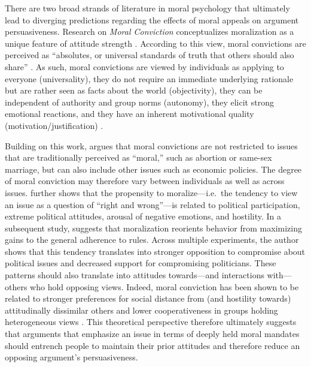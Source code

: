 There are two broad strands of literature in moral psychology that ultimately lead to diverging predictions regarding the effects of moral appeals on argument persuasiveness. Research on \textit{Moral Conviction} conceptualizes moralization as a unique feature of attitude strength \citep{skitka2005moral}. According to this view, moral convictions are perceived as ``absolutes, or universal standards of truth that others should also share'' \citep[269]{skitka2010psychology}. As such, moral convictions are viewed by individuals as applying to everyone (universality), they do not require an immediate underlying rationale but are rather seen as facts about the world (objectivity), they can be independent of authority and group norms (autonomy), they elicit strong emotional reactions, and they have an inherent motivational quality (motivation/justification) \citep{skitka2010psychology}.

Building on this work, \citet{ryan2014reconsidering} argues that moral convictions are not restricted to issues that are traditionally perceived as ``moral,'' such as abortion or same-sex marriage, but can also include other issues such as economic policies. The degree of moral conviction may therefore vary between individuals as well as across issues. \citet{ryan2014reconsidering} further shows that the propensity to moralize---i.e.~the tendency to view an issue as a question of ``right and wrong''---is related to political participation, extreme political attitudes, arousal of negative emotions, and hostility. In a subsequent study, \citet{ryan2017no} suggests that moralization reorients behavior from maximizing gains to the general adherence to rules. Across multiple experiments, the author shows that this tendency translates into stronger opposition to compromise about political issues and decreased support for compromising politicians. These patterns should also translate into attitudes towards---and interactions with---others who hold opposing views. Indeed, moral conviction has been shown to be related to stronger preferences for social distance from (and hostility towards) attitudinally dissimilar others and lower cooperativeness in groups holding heterogeneous views \citep{skitka2005moral}. This theoretical perspective therefore ultimately suggests that arguments that emphasize an issue in terms of deeply held moral mandates should entrench people to maintain their prior attitudes and therefore reduce an opposing argument's persuasiveness.

